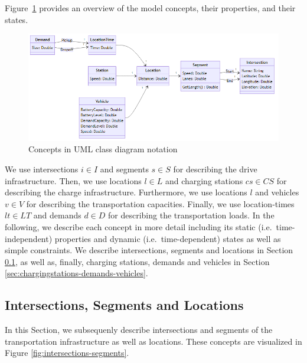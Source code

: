 \documentclass[graybox]{svmult}
\begin{document}
Figure~\ref{fig:concepts} provides an overview of the model concepts, their properties, and their states.
\begin{figure}[t] 
	\centering
	\includegraphics[scale=0.30]{../../diagrams/model/classes-v0.png}
	\caption{Concepts in UML class diagram notation}
	\label{fig:concepts}
\end{figure}
We use intersections $i \in I$ and segments $s \in S$ for describing the drive infrastructure.
Then, we use locations $l \in L$ and charging stations $cs \in CS$ for describing the charge infrastructure.
Furthermore, we use locations $l$ and vehicles $v \in V$ for describing the transportation capacities.
Finally, we use location-times $lt \in LT$ and demands $d \in D$ for describing the transportation loads.
In the following, we describe each concept in more detail including its static (i.e.\ time-independent) properties and dynamic (i.e.\ time-dependent) states as well as simple constraints. We describe intersections, segments and locations in Section \ref{sec:intersections-segments}, as well as, finally, charging stations, demands and vehicles in Section \ref{sec:chargingstations-demands-vehicles}.


\vspace{-2mm}
\subsection{Intersections, Segments and Locations}
\label{sec:intersections-segments}
In this Section, we subsequenly describe intersections and segments of the transportation infrastructure as well as locations. These concepts are visualized in Figure \ref{fig:intersections-segments}.
\end{document}

